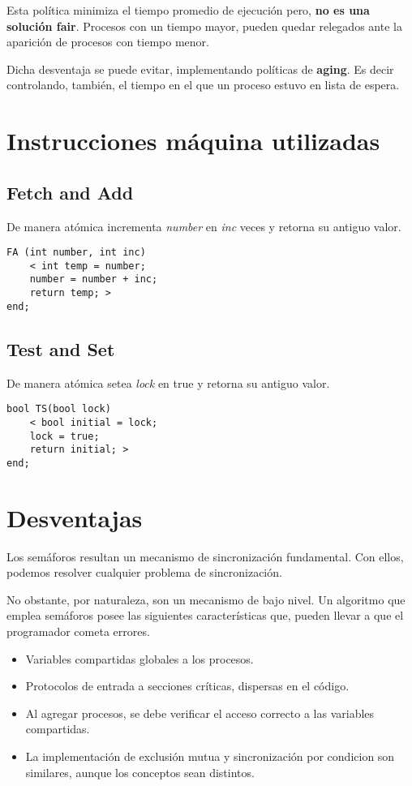 \documentclass[a4paper, 10pt]{report}
\begin{document}
Esta política minimiza el tiempo promedio de ejecución pero, \textbf{no es una solución fair}. Procesos con un tiempo mayor, pueden quedar relegados ante la aparición de procesos con tiempo menor. 

Dicha desventaja se puede evitar, implementando políticas de \textbf{aging}. Es decir controlando, también, el tiempo en el que un proceso estuvo en lista de espera.

\section{Instrucciones máquina utilizadas}

\subsection{Fetch and Add}
De manera atómica incrementa \emph{number} en \emph{inc} veces y retorna su antiguo valor.

\begin{lstlisting}
FA (int number, int inc)
    < int temp = number;
    number = number + inc;
    return temp; >
end;
\end{lstlisting}

\subsection{Test and Set}

De manera atómica setea \emph{lock} en true y retorna su antiguo valor.

\begin{lstlisting}
bool TS(bool lock)
    < bool initial = lock; 
    lock = true; 
    return initial; >
end;
\end{lstlisting}

\section{Desventajas}

Los semáforos resultan un mecanismo de sincronización fundamental. Con ellos, podemos resolver cualquier problema de sincronización.

No obstante, por naturaleza, son un mecanismo de bajo nivel. Un algoritmo que emplea semáforos posee las siguientes características que, pueden llevar a que el programador cometa errores.

\begin{itemize}
    \item Variables compartidas globales a los procesos.
    \item Protocolos de entrada a secciones críticas, dispersas en el código.
    \item Al agregar procesos, se debe verificar el acceso correcto a las variables compartidas.
    \item La implementación de exclusión mutua y sincronización por condicion son similares, aunque los conceptos sean distintos.
\end{itemize}
\end{document}
